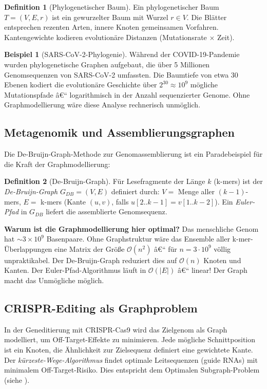 ﻿\documentclass[12pt,a4paper,twoside]{article}
\theoremstyle{definition}
\newtheorem{definition}{Definition}[section]
\newtheorem{beispiel}{Beispiel}[section]
\theoremstyle{plain}
\theoremstyle{remark}
\begin{document}
\begin{definition}[Phylogenetischer Baum]
Ein phylogenetischer Baum $T=(V,E,r)$ ist ein gewurzelter Baum
mit Wurzel $r \in V$.  Die Blätter entsprechen rezenten Arten,
innere Knoten gemeinsamen Vorfahren.  Kantengewichte kodieren
evolutionäre Distanzen (Mutationsrate $\times$ Zeit).
\end{definition}

\begin{beispiel}[SARS-CoV-2-Phylogenie]
Während der COVID-19-Pandemie wurden phylogenetische Graphen
aufgebaut, die über 5 Millionen Genomsequenzen von SARS-CoV-2
umfassten.  Die Baumtiefe von etwa 30 Ebenen kodiert die
evolutionäre Geschichte über $2^{30} \approx 10^9$ mögliche
Mutationspfade â€“ logarithmisch in der Anzahl sequenzierter
Genome.  Ohne Graphmodellierung wäre diese Analyse rechnerisch
unmöglich.
\end{beispiel}

\subsection{Metagenomik und Assemblierungsgraphen}

Die De-Bruijn-Graph-Methode zur Genomassemblierung
ist ein Paradebeispiel für die Kraft der Graphmodellierung:

\begin{definition}[De-Bruijn-Graph]
Für Lesefragmente der Länge $k$ (k-mers) ist der
\emph{De-Bruijn-Graph} $G_{DB}=(V,E)$ definiert durch:
$V = $ Menge aller $(k{-}1)$-mers, $E = $ k-mers
(Kante $(u,v)$, falls $u[2..k{-}1] = v[1..k{-}2]$).
Ein \emph{Euler-Pfad} in $G_{DB}$ liefert die assemblierte
Genomsequenz.
\end{definition}

\textbf{Warum ist die Graphmodellierung hier optimal?} Das menschliche Genom hat $\sim 3 \times 10^9$ Basenpaare. Ohne Graphstruktur wäre das Ensemble aller k-mer-Überlappungen
eine Matrix der Größe $\mathcal{O}(n^2)$ â€“ für $n = 3 \cdot 10^9$
völlig unpraktikabel.  Der De-Bruijn-Graph reduziert dies auf
$\mathcal{O}(n)$ Knoten und Kanten.  Der Euler-Pfad-Algorithmus
läuft in $\mathcal{O}(|E|)$ â€“ linear!  Der Graph macht das
Unmögliche möglich.

\subsection{CRISPR-Editing als Graphproblem}

In der Geneditierung mit CRISPR-Cas9 wird das Zielgenom als
Graph modelliert, um Off-Target-Effekte zu minimieren.
Jede mögliche Schnittposition ist ein Knoten, die Ähnlichkeit
zur Zielsequenz definiert eine gewichtete Kante.  Der
\emph{kürzeste-Wege-Algorithmus} findet optimale Leitsequenzen
(guide RNAs) mit minimalem Off-Target-Risiko.  Dies entspricht
dem Optimalen Subgraph-Problem (siehe ).
\end{document}
